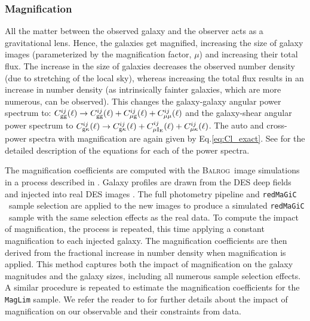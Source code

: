 \documentclass[aps, prd,twocolumn,superscriptaddress,nofootinbib,preprintnumbers]{revtex4-1}
\newcommand{\redmagic}{\texttt{redMaGiC} }
\newcommand{\maglim}{\texttt{MagLim} }
\newcommand{\balrog}{{\textsc{Balrog}}}
\begin{document}
\subsubsection{Magnification}
All the matter between the observed galaxy and the observer acts as a gravitational lens. Hence, the galaxies get magnified, increasing the size of galaxy images (parameterized by the magnification factor, $\mu$) and increasing their total flux. The increase in the size of galaxies decreases the observed number density (due to stretching of the local sky), whereas increasing the total flux results in an increase in number density (as intrinsically fainter galaxies, which are more numerous, can be observed). This changes the galaxy-galaxy angular power spectrum to: $C^{ij}_{\rm gg}(\ell) \to C^{ij}_{\rm gg}(\ell) + C^{ij}_{\rm \mu g}(\ell) + C^{ij}_{\rm \mu \mu}(\ell) $ and the galaxy-shear angular power spectrum to $C^{ij}_{\rm g\kappa}(\ell) \to C^{ij}_{\rm g\kappa}(\ell) + C^{ij}_{\rm \mu I_{\rm E}}(\ell) + C^{ij}_{\rm \mu \kappa}(\ell)$. The auto and cross-power spectra with magnification are again given by Eq.\ref{eq:Cl_exact}. See \cite{y3-generalmethods} for the detailed description of the equations for each of the power spectra. 

The magnification coefficients are computed with the \balrog\ image simulations \citep{Suchyta_2016,y3-balrog} in a process described in \cite{y3-2x2ptmagnification}. Galaxy profiles are drawn from the DES deep fields \citep{y3-deepfields} and injected into real DES images \citep{Morganson_2018}. The full photometry pipeline \citep{y3-gold} and \redmagic\ sample selection are applied to the new images to produce a simulated \redmagic\ sample with the same selection effects as the real data. To compute the impact of magnification, the process is repeated, this time applying a constant magnification to each injected galaxy. The magnification coefficients are then derived from the fractional increase in number density when magnification is applied. This method captures both the impact of magnification on the galaxy magnitudes and the galaxy sizes, including all numerous sample selection effects. A similar procedure is repeated to estimate the magnification coefficients for the \maglim sample. We refer the reader to \citet*{y3-2x2ptmagnification} for further details about the impact of magnification on our observable and their constraints from data. 
\end{document}
